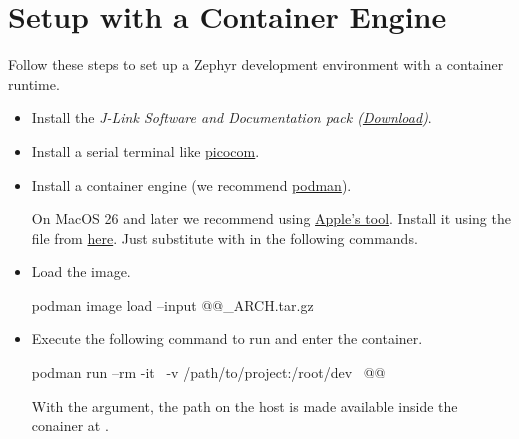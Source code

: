 \section{Setup with a Container Engine}
\label{setupwithcontainerengine}

Follow these steps to set up a Zephyr development environment with a container runtime.

\begin{itemize}
  \item Install the \emph{J-Link Software and Documentation pack (\href{https://www.segger.com/downloads/jlink}{Download})}.
  \item Install a serial terminal like \href{https://formulae.brew.sh/formula/picocom}{picocom}.
  \item Install a container engine (we recommend \href{https://podman.io/docs/installation}{podman}).
    \begin{infobox}
      On MacOS 26 and later we recommend using \href{https://opensource.apple.com/projects/container/}{Apple's  tool}.
      Install it using the  file from \href{https://github.com/apple/container/releases}{here}.
      Just substitute  with  in the following commands.
    \end{infobox}
  \item Load the image.
        \begin{monobox}
podman image load --input @\imagename{}@_ARCH.tar.gz
\end{monobox}
  \item Execute the following command to run and enter the container.
        \begin{monobox}
podman run --rm -it \
  -v /path/to/project:/root/dev \
  @\imagename{}@
\end{monobox}
    With the  argument, the  path on the host is made available inside the conainer at .
\end{itemize}
